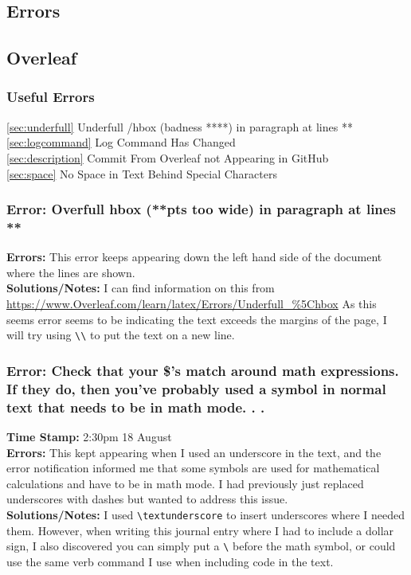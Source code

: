 \documentclass{article}
\begin{document}
\begin{FlushLeft}
\pagebreak

\section{Errors}
\subsection{Overleaf}

\subsubsection{Useful Errors}
\autoref{sec:underfull} Underfull /hbox (badness ****) in paragraph at lines **\\
\autoref{sec:logcommand} Log Command Has Changed\\
\autoref{sec:description} Commit From Overleaf not Appearing in GitHub\\
\autoref{sec:space} No Space in Text Behind Special Characters

\subsubsection{Error: Overfull hbox (**pts too wide) in paragraph at lines **}
\textbf{Errors:} This error keeps appearing down the left hand side of the document where the lines are shown.\\
\textbf{Solutions/Notes:} I can find information on this from \url{https://www.Overleaf.com/learn/latex/Errors/Underfull_%5Chbox}
As this seems error seems to be indicating the text exceeds the margins of the page, I will try using \verb|\\| to put the text on a new line. 

\subsubsection{Error: Check that your \$'s match around math expressions. If they do, then you've probably used a symbol in normal text that needs to be in math mode. . .}
\textbf{Time Stamp:} 2:30pm 18 August\\
\textbf{Errors:} This kept appearing when I used an underscore in the text, and the error notification informed me that some symbols are used for mathematical calculations and have to be in math mode. I had previously just replaced underscores with dashes but wanted to address this issue.\\
\textbf{Solutions/Notes:} I used \verb|\textunderscore| to insert underscores where I needed them. However, when writing this journal entry where I had to include a dollar sign, I also discovered you can simply put a \verb|\| before the math symbol, or could use the same verb command I use when including code in the text.


\end{FlushLeft}
\end{document}

